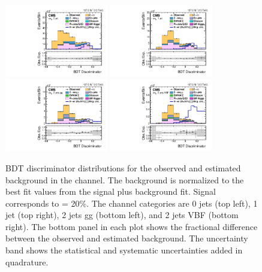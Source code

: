 \begin{figure}[htbp!]
  \centering
  \includegraphics[width=0.4\textwidth]{plots/chapter9/BDT/etau/0jet.pdf}
  \includegraphics[width=0.4\textwidth]{plots/chapter9/BDT/etau/1jet.pdf} \\
  \includegraphics[width=0.4\textwidth]{plots/chapter9/BDT/etau/2jet_gg.pdf}
  \includegraphics[width=0.4\textwidth]{plots/chapter9/BDT/etau/2jet_vbf.pdf} \\
  \caption{BDT discriminator distributions for the observed and estimated background in the \ehad channel. The background is normalized to the best fit values from the signal plus background fit. Signal corresponds to \BHet = 20\%. The \ehad channel categories are 0 jets (top left), 1 jet (top right), 2 jets gg (bottom left), and 2 jets VBF (bottom right). The bottom panel in each plot shows the fractional difference between the observed and estimated background. The uncertainty band shows the statistical and systematic uncertainties added in quadrature.}
  \label{fig:bdt_ehad}
\end{figure}


